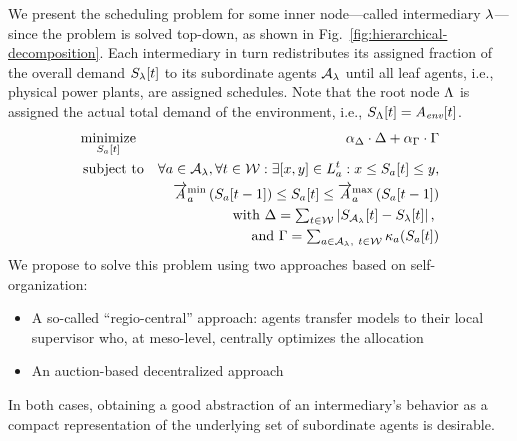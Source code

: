 \documentclass[conference]{IEEEtran}
\newcommand{\fref}[1]{Fig.~\ref{#1}}
\begin{document}
We present the scheduling problem for some inner node---called intermediary $\lambda$---since the problem is solved top-down, as shown in 
\fref{fig:hierarchical-decomposition}.
Each intermediary in turn redistributes its assigned fraction of the overall demand $S_{\lambda}[t]$ to 
its subordinate agents ${\mathcal{A}_{\lambda}}$ until all leaf agents, i.e., physical power plants, are assigned schedules. Note
that the root node $\Lambda$ is assigned the actual total demand of the environment, i.e., $S_{\Lambda}[t] = A_{\textit{env}}[t]$.
%
\begin{eqnarray}
\label{eq:csop-scheduling-hierarchy} \textstyle
		& \underset{\AgentPower{t}{\AnAgent}}{\operatorname{minimize}} & 
		\alpha_{\ViolationObjective} \cdot \ViolationObjective + \alpha_{\CostsObjective} \cdot \CostsObjective \\
		& \operatorname{subject\ to} & \forall a \in \Subsystem, \forall t \in \Horizon : \exists [x , y] \in \ListProduction{t}\AnAgent : x \leq \AgentPower{t}{\AnAgent} \leq y\text{,} \nonumber \\
		& & \ChangeSpeedMin\AnAgent \left(\AgentPower{t-1}\AnAgent\right) \leq \AgentPower{t}{\AnAgent} \leq \ChangeSpeedMax\AnAgent\left(\AgentPower{t-1}\AnAgent\right) \nonumber\\
		& & \textstyle \text{with } \ViolationObjective = \sum_{t \in \Horizon} \left|\Production_\Subsystem[t] - \AssResidualLoad{t}{\AnAvpp} \right| \text{, } \nonumber \\
		& & \textstyle \text{and } 
		\CostsObjective = \sum_{a \in \Subsystem,\ t \in \Horizon} \CostFunction\AnAgent{\AgentPower{t}{\AnAgent}} \nonumber
\end{eqnarray}
%
We propose to solve this problem using two approaches based on self-organization:
\begin{itemize}
\item A so-called ``regio-central'' approach: agents transfer models to their local supervisor who, at meso-level,
centrally optimizes the allocation~\cite{Schiendorfer2014, SchiendorferSyn2014}
\item An auction-based decentralized approach~\cite{Anders-TAAS-2015}
\end{itemize}

In both cases, obtaining a good abstraction of an intermediary's behavior as a compact
representation of the underlying set of subordinate agents is desirable.
\end{document}
